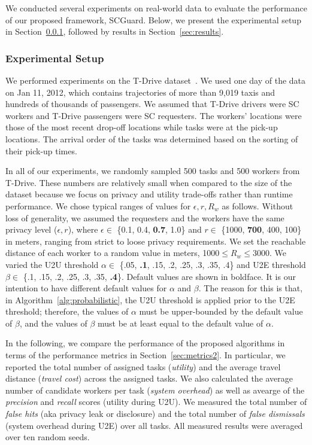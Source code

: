 \documentclass{USC-Thesis}
\newcommand{\SCG}{{SCGuard}}
\numberwithin{equation}{chapter}
\begin{document}
We conducted several experiments on real-world data to evaluate the performance of our proposed framework, \SCG. Below, we present the experimental setup in Section~\ref{sec:methodology}, followed by results in Section~\ref {sec:results}.

\subsubsection{Experimental Setup}
\label{sec:methodology}
We performed experiments on the T-Drive dataset~\cite{yuan2010t}. We used one day of the data on Jan 11, 2012, which contains trajectories of more than 9,019 taxis and hundreds of thousands of passengers. We assumed that T-Drive drivers were SC workers and T-Drive passengers were SC requesters. The workers' locations were those of the most recent drop-off locations while tasks were at the pick-up locations. The arrival order of the tasks was determined based on the sorting of their pick-up times.

In all of our experiments, we randomly sampled 500 tasks and 500 workers from T-Drive. These numbers are relatively small when compared to the size of the dataset because we focus on privacy and utility trade-offs rather than runtime performance.
We chose typical ranges of values for $\epsilon,r,R_w$ as follows. Without loss of generality, we assumed the requesters and the workers have the same privacy level ($\epsilon,r$), where $\epsilon \in$ \{0.1, 0.4, \textbf{0.7}, 1.0\} and $r \in$ \{1000, \textbf{700}, 400, 100\} in meters, ranging from strict to loose privacy requirements.
We set the reachable distance of each worker to a random value in meters, 1000$\le R_w\le$3000.
We varied the U2U threshold $\alpha \in$ \{.05, \textbf{.1}, .15, .2, .25, .3, .35, .4\} and U2E threshold $\beta \in$ \{.1, .15, .2, .25, .3, .35, \textbf{.4}\}.
Default values are shown in boldface. It is our intention to have different default values for $\alpha$ and $\beta$. The reason for this is that, in Algorithm~\ref{alg:probabilistic}, the U2U threshold is applied prior to the U2E threshold; therefore, the values of $\alpha$ must be upper-bounded by the default value of $\beta$, and the values of $\beta$ must be at least equal to the default value of $\alpha$.

In the following, we compare the performance of the proposed algorithms in terms of the performance metrics in Section~\ref{sec:metrics2}. In particular, we reported the total number of assigned tasks (\emph{utility}) and the average travel distance (\emph{travel cost}) across the assigned tasks. We also calculated the average number of candidate workers per task (\emph{system overhead}) as well as avearge of the \emph{precision} and \emph{recall} scores (utility during U2U). We measured the total number of \emph{false hits} (aka privacy leak or disclosure) and the total number of \emph{false dismissals} (system overhead during U2E) over all tasks.
All measured results were averaged over ten random seeds.
\end{document}
